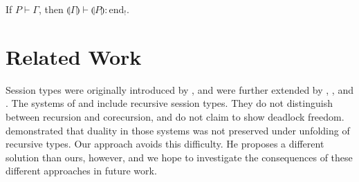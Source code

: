 \documentclass[orivec,envcountsame]{llncs}
\newcommand{\cpdual}[1]{#1^\perp}
\newcommand{\gvdual}[1]{\overline{#1}}
\newcommand{\gvout}[2]{{!#1.#2}}
\newcommand{\outterm}{\mathrm{end}_!}
\newcommand{\gvservice}[1]{\sharp #1}
\newcommand{\cptyp}[2]{#1 \vdash #2}
\newcommand{\gvtyp}[3]{#1 \vdash #2 : #3}
\newcommand{\mapname}{\mathsf{map}}
\newcommand{\gvmap}[3]{\mapname^{#1}_{#2}\:#3}
\newcommand{\mkwd}[1]{\mathsf{#1}}
\newcommand{\gvsend}[2]{\mkwd{send}\:#1\:#2}
\newcommand{\gvlet}[3]{\mkwd{let}\;#1 = #2\;\mkwd{in}\;#3}
\newcommand{\gvfork}[2]{\mkwd{fork}\:#1.#2}
\newcommand{\lrkwd}{\mkwd{cofix}}
\newcommand{\gvfix}[3]{\lrkwd\:#1\:#2 = #3}
\newcommand{\key}{\mkwd}
\newcommand{\togv}[1]{\llparenthesis #1 \rrparenthesis}
\newcommand{\mucp}{$\mu\mathrm{CP}$\xspace}
\newcommand{\mugv}{$\mu\mathrm{GV}$\xspace}
\begin{document}

%







\begin{theorem}
  If $\cptyp{P}{\Gamma}$, then $\gvtyp{\togv{\Gamma}}{\togv{P}}{\outterm}$.
\end{theorem}

\section{Related Work}\label{sec:related}

Session types were originally introduced by \citet{Honda93}, and were further extended by
\citet{Takeuchi94}, \citet{Honda98}, and \citet{Yoshida07}.  The systems of \citet{Honda98} and
\citet{Yoshida07} include recursive session types.  They do not distinguish between recursion and
corecursion, and do not claim to show deadlock freedom.  \citet{Bernardi13} demonstrated that
duality in those systems was not preserved under unfolding of recursive types.  Our approach avoids
this difficulty.  He proposes a different solution than ours, however, and we hope to investigate
the consequences of these different approaches in future work.
\end{document}
